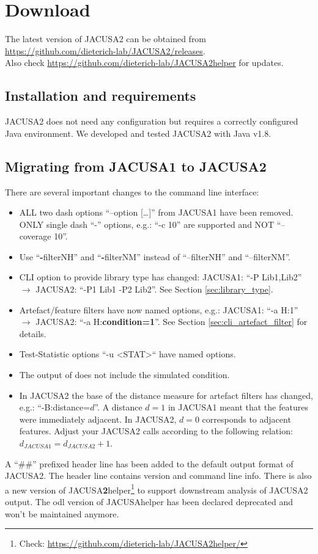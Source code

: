 \documentclass[10pt,a4paper,final]{article}
\begin{document}
\section{Download}
The latest version of JACUSA2 can be obtained from \url{https://github.com/dieterich-lab/JACUSA2/releases}. \\
Also check \url{https://github.com/dieterich-lab/JACUSA2helper} for updates.
\subsection{Installation and requirements}
JACUSA2 does not need any configuration but requires a correctly configured Java environment.
We developed and tested JACUSA2 with Java v1.8.
\subsection{Migrating from JACUSA1 to JACUSA2}\label{sec:migration}
There are several important changes to the command line interface:
\begin{itemize}
  \item ALL two dash options ``--option [\ldots]'' from JACUSA1 have been removed. ONLY single dash 
  ``-'' options, e.g.: ``-c 10'' are supported and NOT ``--coverage 10''.
  \item Use ``\textbf{-}filterNH'' and ``\textbf{-}filterNM'' instead of ``--filterNH'' and
  ``--filterNM''.
  \item CLI option to provide library type has changed: JACUSA1: ``-P Lib1,Lib2'' $\rightarrow$
  JACUSA2: ``-P1 Lib1 -P2 Lib2''. See Section \ref{sec:library_type}.
  \item Artefact/feature filters have now named options, e.g.: JACUSA1: ``-a H:1'' $\rightarrow$
  JACUSA2: ``-a H:\textbf{condition=1}''. See Section \ref{sec:cli_artefact_filter} for details.
  \item Test-Statistic options ``-u <STAT>`` have named options.
  \item The output of  does not include the simulated condition.
  \item In JACUSA2 the base of the distance measure for artefact filters has changed, e.g.: ``-B:distance=$d$''.
   A distance $d=1$ in JACUSA1 meant that the features were immediately adjacent. In JACUSA2, 
   $d=0$ corresponds to adjacent features. Adjust your JACUSA2 calls according to the following 
   relation: $d_{JACUSA1} = d_{JACUSA2} +1 $.
\end{itemize}
A ``\#\#'' prefixed header line has been added to the default output format of JACUSA2. The header
line contains version and command line info.
There is also a new version of JACUSA\textbf{2}helper\footnote{Check: 
\url{https://github.com/dieterich-lab/JACUSA2helper/}} to support downstream
analysis of JACUSA2 output. The odl version of JACUSAhelper has been declared deprecated and won't be maintained
anymore.
\end{document}
